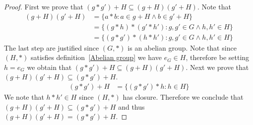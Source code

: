 \documentclass{article}
\theoremstyle{plain}
\theoremstyle{definition}
\begin{document}
\begin{proof}
	First we prove that $(g*g')+H\subseteq (g+H)(g'+H)$. Note that
	\begin{equation}
	\begin{aligned}
		(g+H)(g'+H) &= \{a*b:a\in g+H\land b\in g'+H\}\\
					&= \{(g*h)*(g'*h'):g,g'\in G\land h,h'\in H\}\\
					&= \{(g*g')*(h*h'):g,g'\in G\land h,h'\in H\}
	\end{aligned}
	\end{equation}
	The last step are justified since $(G,*)$ is an abelian group. Note that
	since $(H,*)$ satisfies definition~\ref{Abelian group} we have $e_G\in H$,
	therefore be setting $h=e_G$ we obtain that $(g*g')+H\subseteq (g+H)(g'+H)$.
	Next we prove that $(g+H)(g'+H)\subseteq (g*g')+H$. 
	\begin{equation}
	\begin{aligned}
		(g*g')+H &= \{(g*g')*h:h\in H\}
	\end{aligned}
	\end{equation}
	We note that $h*h'\in H$ since $(H,*)$ has closure. Therefore we conclude
	that $(g+H)(g'+H)\subseteq (g*g')+H$ and thus $(g+H)(g'+H)=(g*g')+H$.
\end{proof}
\end{document}
